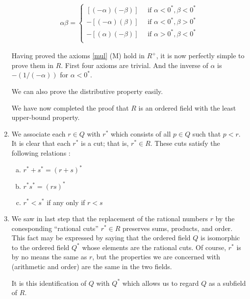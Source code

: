 \begin{enumerate}[{\bf Step 1.}]
\begin{gather*}
    \alpha \beta = 
    \begin{cases}
      [(-\alpha)(-\beta)] \quad \text{ if } \alpha < 0^*, \beta < 0^* \\
      -[(-\alpha)(\beta)] \quad \text{ if } \alpha < 0^*, \beta > 0^* \\
      -[(\alpha)(-\beta)] \quad \text{ if } \alpha > 0^*, \beta < 0^* \\
    \end{cases}
\end{gather*}

Having proved the axioms \ref{mul} (M) hold in $R^+$, it is now perfectly simple to prove them in $R$.
First four axioms are trivial. And the inverse of $\alpha$ is $-(1/(-\alpha))$ for $\alpha < 0^*$.

We can also prove the distributive property easily.

We have now completed the proof that $R$ is an ordered field with the least upper-bound property.

\item We associate each $r \in Q$ with $r^*$ which consists of all $p \in Q$
such that $p < r$. It is clear that each $r^*$ is a cut; that is, $r^* \in R$.
These cuts satisfy the following relations : 

\begin{enumerate}[(a)]
    \item $r^* + s^* = (r+s)^*$
    \item $r^*  s^* = (rs)^*$
    \item $r^* < s^*$ if any only if $r < s$
\end{enumerate}

\item We saw in last step that the replacement of the rational numbers $r$ by the conesponding ``rational cuts'' $r^* \in R$ preserves sums, products, and order. 
This fact may be expressed by saying that the ordered field $Q$ is isomorphic to the ordered field $Q^*$ whose elements are the rational cuts. 
Of course, $r^*$ is by no means the same as $r$, but the properties we are concerned with (arithmetic and order) are the same in the two fields. 

It is this identification of $Q$ with $Q^*$ which allows us to regard $Q$ as a subfield of $R$.

\end{enumerate}


